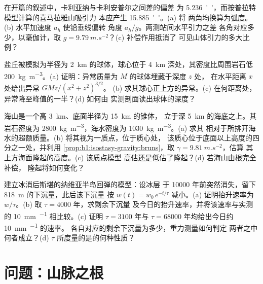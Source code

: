 \begin{exercise}[$\star\star$]\label{exo:b1:isostasy-gravity:9}
在开篇的叙述中，卡利亚纳与卡利安普尔之间差的偏差
为 \qty{5.236}{''}，而按普拉特模型计算的喜马拉雅山吸引力
本应产生 \qty{15.885}{''}。(a) 将
两角均换算为弧度。(b) 水平加速度 $a_h$ 使铅垂线偏转
角度 $a_h/g$。两测站间水平引力之差
各角对应多少，以毫伽计，取
$g = \qty{9.79}{m.s^{-2}}$？(c) 补偿作用抵消了
可见山体引力的多大比例？
\end{exercise}

\begin{exercise}[$\star\star\star$]\label{exo:b1:isostasy-gravity:10}
盐丘被模拟为半径为 \qty{2}{km} 的球体，球心位于
\qty{4}{km} 深处，其密度比周围岩石低
\qty{200}{kg.m^{-3}}。(a) 证明：异常质量为 $M$ 的球体埋藏于深度 $z$ 处，
在水平距离 $x$ 处给出异常 $GMz/(x^2 + z^2)^{3/2}$。
(b) 求其球心正上方的异常。(c) 在何距离处，
异常降至峰值的一半？(d) 如何由
实测剖面读出球体的深度？
\end{exercise}

\begin{exercise}[$\star\star\star$]\label{exo:b1:isostasy-gravity:11}
海山是一个高 \qty{3}{km}、底面半径为 \qty{15}{km} 的锥体，
立于深 \qty{5}{km} 的海底之上。其岩石密度为
\qty{2800}{kg.m^{-3}}，海水密度为 \qty{1030}{kg.m^{-3}}。(a) 求其
相对于所排开海水的超额质量。(b) 将其视为一质点，位于质心处，
该质心位于底面以上高度的四分之一处，并利用
\cref{prop:b1:isostasy-gravity:bruns}，取 $\gamma = \qty{9.81}{m.s^{-2}}$，估算
其上方海面隆起的高度。(c) 该质点模型
高估还是低估了隆起？(d) 若海山由根完全补偿，
隆起将如何变化？
\end{exercise}

\begin{exercise}[$\star\star\star$]\label{exo:b1:isostasy-gravity:12}
建立冰消后斯堪的纳维亚半岛回弹的模型：设冰层
于 \num{10000} 年前突然消失，留下 \qty{818}{m} 的下沉量，此后该下沉量
按 $w(t) = w_0\,e^{-t/\tau}$ 减小。(a) 证明抬升速率为
$w/\tau$。(b) 取 $\tau = \num{4000}$ 年，求剩余下沉量
及今日的抬升速率，并将该速率与实测的
\qty{10}{mm.^{-1}} 相比较。(c) 证明 $\tau = \num{3100}$ 年与
$\tau = \num{68000}$ 年均给出今日约 \qty{10}{mm.^{-1}} 的速率。
各自对应的剩余下沉量为多少，重力测量如何判定
两者之中何者成立？(d) $\tau$ 所度量的是的何种性质？
\end{exercise}

\section{问题：山脉之根}

